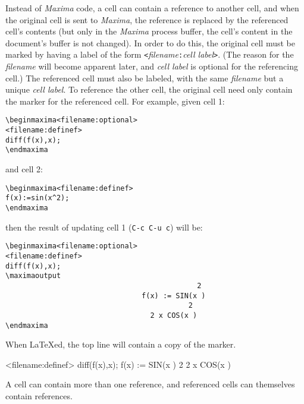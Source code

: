 \documentclass{article}
\newcommand{\mx}{\textsl{\sffamily Maxima}}
\begin{document}
\noindent
Instead of \mx{} code, a cell can contain a reference to another cell,
and when the original cell is sent to \mx{}, the reference is replaced
by the referenced cell's contents (but only in the \mx{} process
buffer, the cell's 
content in the document's buffer is not changed).  In order to do
this, the original cell must be marked by having a label of the form
\texttt{<}\textsl{filename}\texttt{:}\textsl{cell label}\texttt{>}.
(The reason for the \textsl{filename} will become apparent later, and
\textsl{cell label} is optional for the referencing cell.)
The referenced cell must also be labeled, with the same
\textsl{filename} but a unique \textsl{cell label}.  To reference the
other cell, the original cell need only contain the marker for the
referenced cell.  For example, given cell 1:
\begin{verbatim}
\beginmaxima<filename:optional>
<filename:definef>
diff(f(x),x);
\endmaxima
\end{verbatim}
\noindent
and cell 2:
\begin{verbatim}
\beginmaxima<filename:definef>
f(x):=sin(x^2);
\endmaxima
\end{verbatim}
\noindent
then the result of updating cell 1 (\texttt{C-c C-u c}) will be:
\begin{verbatim}
\beginmaxima<filename:optional>
<filename:definef>
diff(f(x),x);
\maximaoutput
                                             2
                                f(x) := SIN(x )
                                           2
                                  2 x COS(x )
\endmaxima
\end{verbatim}
\noindent
When \LaTeX{}ed, the top line will contain a copy of the marker.

\newpage

<filename:definef>
diff(f(x),x);
                                f(x) := SIN(x )
                                           2
                                  2 x COS(x )
\endmaxima

A cell can contain more than one reference, and referenced cells can
themselves contain references.  
\end{document}
